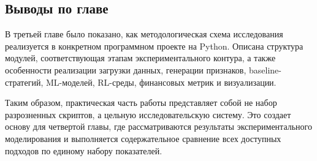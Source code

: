 \subsection{Выводы по главе}

В третьей главе было показано, как методологическая схема исследования реализуется в конкретном программном проекте на Python. Описана структура модулей, соответствующая этапам экспериментального контура, а также особенности реализации загрузки данных, генерации признаков, baseline-стратегий, ML-моделей, RL-среды, финансовых метрик и визуализации.

Таким образом, практическая часть работы представляет собой не набор разрозненных скриптов, а цельную исследовательскую систему. Это создает основу для четвертой главы, где рассматриваются результаты экспериментального моделирования и выполняется содержательное сравнение всех доступных подходов по единому набору показателей.
